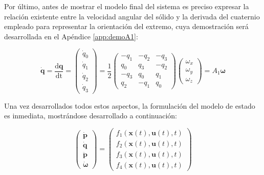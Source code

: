 Por último, antes de mostrar el modelo final del sistema es preciso expresar la relación existente entre la velocidad angular del sólido y la derivada del cuaternio empleado para representar la orientación del extremo, cuya demostración será desarrollada en el Apéndice \ref{app:demoA1}:

\begin{equation}
	\boldsymbol{\dot{q}} = \frac{\mathrm{d}\boldsymbol{q}}{\mathrm{dt}} = 
	\begin{pmatrix}
	\dot{q}_0 \\ \dot{q}_1 \\ \dot{q}_2 \\ \dot{q}_3
	\end{pmatrix} = 
	\frac{1}{2}
	\begin{pmatrix}
	-q_1 & -q_2 & -q_3 \\ q_0 & q_3 & -q_2 \\ -q_3 & q_0 & q_1 \\ q_2 & -q_1 & q_0
	\end{pmatrix}
	\begin{pmatrix}
	\omega_x \\ \omega_y \\ \omega_z
	\end{pmatrix} = 
	A_1 \boldsymbol{\omega}
\end{equation}

Una vez desarrollados todos estos aspectos, la formulación del modelo de estado es inmediata, mostrándose desarrollado a continuación:

\begin{equation}
	\begin{pmatrix}	
	\boldsymbol{\dot{p}} \\ \boldsymbol{\dot{q}} \\ \boldsymbol{\ddot{p}} \\ 					\boldsymbol{\dot{\omega}}
	\end{pmatrix} = 
	\begin{pmatrix}	
	f_1(\boldsymbol{x}(t),\boldsymbol{u}(t),t) \\
	f_2(\boldsymbol{x}(t),\boldsymbol{u}(t),t) \\
	f_3(\boldsymbol{x}(t),\boldsymbol{u}(t),t) \\
	f_4(\boldsymbol{x}(t),\boldsymbol{u}(t),t)
	\end{pmatrix}
\end{equation}

